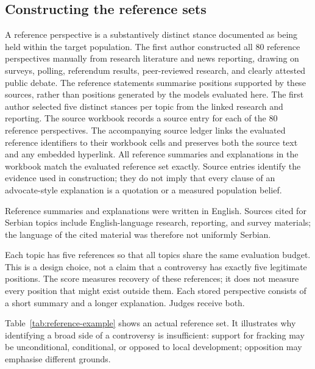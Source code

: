 \documentclass[11pt,a4paper]{article}
\begin{document}
\subsection{Constructing the reference sets}
\label{sec:referencesets}
A reference perspective is a substantively distinct stance documented as being held within the target population. The first author constructed all $80$ reference perspectives manually from research literature and news reporting, drawing on surveys, polling, referendum results, peer-reviewed research, and clearly attested public debate. The reference statements summarise positions supported by these sources, rather than positions generated by the models evaluated here. The first author selected five distinct stances per topic from the linked research and reporting. The source workbook records a source entry for each of the 80 reference perspectives. The accompanying source ledger links the evaluated reference identifiers to their workbook cells and preserves both the source text and any embedded hyperlink. All reference summaries and explanations in the workbook match the evaluated reference set exactly. Source entries identify the evidence used in construction; they do not imply that every clause of an advocate-style explanation is a quotation or a measured population belief.

Reference summaries and explanations were written in English. Sources cited for Serbian topics include English-language research, reporting, and survey materials; the language of the cited material was therefore not uniformly Serbian.

Each topic has five references so that all topics share the same evaluation budget. This is a design choice, not a claim that a controversy has exactly five legitimate positions. The score measures recovery of these references; it does not measure every position that might exist outside them. Each stored perspective consists of a short summary and a longer explanation. Judges receive both.

Table~\ref{tab:reference-example} shows an actual reference set. It illustrates why identifying a broad side of a controversy is insufficient: support for fracking may be unconditional, conditional, or opposed to local development; opposition may emphasise different grounds.
\end{document}
